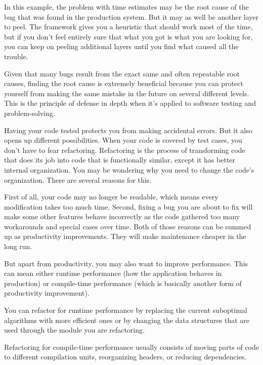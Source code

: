 In this example, the problem with time estimates may be the root cause of the bug that was found in the production system. But it may as well be another layer to peel. The framework gives you a heuristic that should work most of the time, but if you don't feel entirely sure that what you got is what you are looking for, you can keep on peeling additional layers until you find what caused all the trouble.

Given that many bugs result from the exact same and often repeatable root causes, finding the root cause is extremely beneficial because you can protect yourself from making the same mistake in the future on several different levels. This is the principle of defense in depth when it's applied to software testing and problem-solving.


Having your code tested protects you from making accidental errors. But it also opens up different possibilities. When your code is covered by test cases, you don't have to fear refactoring. Refactoring is the process of transforming code that does its job into code that is functionally similar, except it has better internal organization. You may be wondering why you need to change the code's organization. There are several reasons for this.

First of all, your code may no longer be readable, which means every modification takes too much time. Second, fixing a bug you are about to fix will make some other features behave incorrectly as the code gathered too many workarounds and special cases over time. Both of those reasons can be summed up as productivity improvements. They will make maintenance cheaper in the long run.

But apart from productivity, you may also want to improve performance. This can mean either runtime performance (how the application behaves in production) or compile-time performance (which is basically another form of productivity improvement).

You can refactor for runtime performance by replacing the current suboptimal algorithms with more efficient ones or by changing the data structures that are used through the module you are refactoring.

Refactoring for compile-time performance usually consists of moving parts of code to different compilation units, reorganizing headers, or reducing dependencies.


